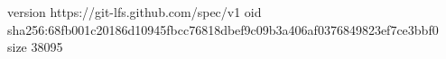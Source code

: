 version https://git-lfs.github.com/spec/v1
oid sha256:68fb001c20186d10945fbcc76818dbef9c09b3a406af0376849823ef7ce3bbf0
size 38095
